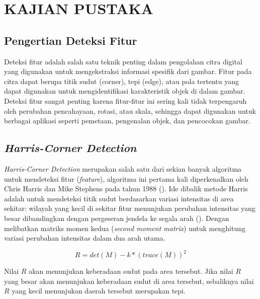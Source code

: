 
\chapter{KAJIAN PUSTAKA}

\section{Pengertian Deteksi Fitur}
  Deteksi fitur adalah salah satu teknik penting dalam pengolahan citra digital yang digunakan untuk mengekstraksi informasi spesifik dari gambar. 
Fitur pada citra dapat berupa titik sudut (corner), tepi (edge), atau pola tertentu yang dapat digunakan untuk mengidentifikasi karakteristik objek di dalam gambar. 
Deteksi fitur sangat penting karena fitur-fitur ini sering kali tidak terpengaruh oleh perubahan pencahayaan, rotasi, atau skala, sehingga dapat digunakan untuk berbagai aplikasi seperti pemetaan, pengenalan objek, dan pencocokan gambar.

\section{\emph{Harris-Corner Detection}}
  \emph{Harris-Corner Detection} merupakan salah satu dari sekian banyak algoritma untuk mendeteksi fitur (\emph{feature}), algoritma ini pertama kali diperkenalkan oleh Chris Harris dan Mike Stephens pada tahun 1988 (\cite{Harris2013}). 
Ide dibalik metode Harris adalah untuk mendeteksi titik sudut berdasarkan variasi intensitas di area sekitar: wilayah yang kecil di sekitar fitur menunjukan perubahan intensitas yang besar dibandingkan dengan pergeseran jendela ke segala arah (\cite{Sanchez2018}).
Dengan melibatkan matriks momen kedua (\emph{second moment matrix}) untuk menghitung variasi perubahan intensitas dalam dua arah utama.

\begin{equation}
  R = det(M) - k * (trace(M))^2
  \label{HarrisCorner}
\end{equation}

  Nilai \(R\) akan menunjukan keberadaan sudut pada area tersebut. 
Jika nilai \(R\) yang besar akan menunjukan keberadaan sudut di area tersebut, sebaliknya nilai \(R\) yang kecil menunjukan daerah tersebut merupakan tepi.

